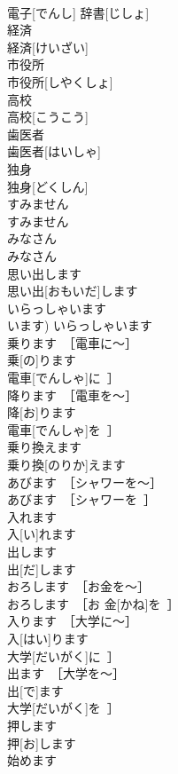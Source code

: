 \documentclass[8pt]{extreport}
\begin{document}
\begin{CJK}{UTF8}{min}
\\	電子[でんし] 辞書[じしょ]	
\\	経済	
\\	経済[けいざい]	
\\	市役所	
\\	市役所[しやくしょ]	
\\	高校	
\\	高校[こうこう]	
\\	歯医者	
\\	歯医者[はいしゃ]	
\\	独身	
\\	独身[どくしん]	
\\	すみません	
\\	すみません	
\\	みなさん	
\\	みなさん	
\\	思い出します	
\\	思い出[おもいだ]します	
\\	いらっしゃいます	
\\	います)	いらっしゃいます	
\\	乗ります　［電車に～］	
\\	乗[の]ります　
\\	電車[でんしゃ]に~］	
\\	降ります　［電車を～］	
\\	降[お]ります　
\\	電車[でんしゃ]を~］	
\\	乗り換えます	
\\	乗り換[のりか]えます	
\\	あびます　［シャワーを～］	
\\	あびます　［シャワーを~］	
\\	入れます	
\\	入[い]れます	
\\	出します	
\\	出[だ]します	
\\	おろします　［お金を～］	
\\	おろします　［お 金[かね]を~］	
\\	入ります　［大学に～］	
\\	入[はい]ります　
\\	大学[だいがく]に~］	
\\	出ます　［大学を～］	
\\	出[で]ます　
\\	大学[だいがく]を~］	
\\	押します	
\\	押[お]します	
\\	始めます	

\end{CJK}
\end{document}
